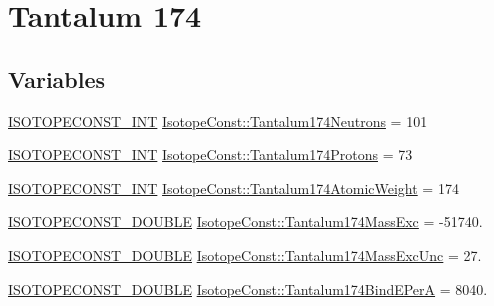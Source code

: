 \hypertarget{group___isotope_const-_tantalum-_ta174}{}\section{Tantalum 174}
\label{group___isotope_const-_tantalum-_ta174}
\subsection*{Variables}
\begin{DoxyCompactItemize}
\item 
\mbox{\hyperlink{group___isotope_const-_macros_ga5f18360b3e99483a35c32d789e62621c}{I\+S\+O\+T\+O\+P\+E\+C\+O\+N\+S\+T\+\_\+\+I\+NT}} \mbox{\hyperlink{group___isotope_const-_tantalum-_ta174_ga6c6c158e1b439ca5400350738d6df4cc}{Isotope\+Const\+::\+Tantalum174\+Neutrons}} = 101
\item 
\mbox{\hyperlink{group___isotope_const-_macros_ga5f18360b3e99483a35c32d789e62621c}{I\+S\+O\+T\+O\+P\+E\+C\+O\+N\+S\+T\+\_\+\+I\+NT}} \mbox{\hyperlink{group___isotope_const-_tantalum-_ta174_ga851a38424bb7b0bd301ebf1d60d036eb}{Isotope\+Const\+::\+Tantalum174\+Protons}} = 73
\item 
\mbox{\hyperlink{group___isotope_const-_macros_ga5f18360b3e99483a35c32d789e62621c}{I\+S\+O\+T\+O\+P\+E\+C\+O\+N\+S\+T\+\_\+\+I\+NT}} \mbox{\hyperlink{group___isotope_const-_tantalum-_ta174_gaeb0d38a351c8b9e22127a6ea1353c285}{Isotope\+Const\+::\+Tantalum174\+Atomic\+Weight}} = 174
\item 
\mbox{\hyperlink{group___isotope_const-_macros_ga8f45a7272ce02c0b4c65c44636ed719a}{I\+S\+O\+T\+O\+P\+E\+C\+O\+N\+S\+T\+\_\+\+D\+O\+U\+B\+LE}} \mbox{\hyperlink{group___isotope_const-_tantalum-_ta174_gaa175f2eac83c3bb587e0e38f9d4d44f2}{Isotope\+Const\+::\+Tantalum174\+Mass\+Exc}} = -\/51740.
\item 
\mbox{\hyperlink{group___isotope_const-_macros_ga8f45a7272ce02c0b4c65c44636ed719a}{I\+S\+O\+T\+O\+P\+E\+C\+O\+N\+S\+T\+\_\+\+D\+O\+U\+B\+LE}} \mbox{\hyperlink{group___isotope_const-_tantalum-_ta174_gabcc28e47443d4ffff348affd42d699d6}{Isotope\+Const\+::\+Tantalum174\+Mass\+Exc\+Unc}} = 27.
\item 
\mbox{\hyperlink{group___isotope_const-_macros_ga8f45a7272ce02c0b4c65c44636ed719a}{I\+S\+O\+T\+O\+P\+E\+C\+O\+N\+S\+T\+\_\+\+D\+O\+U\+B\+LE}} \mbox{\hyperlink{group___isotope_const-_tantalum-_ta174_ga652e6a0aa43050764949f6c5eb846e7b}{Isotope\+Const\+::\+Tantalum174\+Bind\+E\+PerA}} = 8040.
\item 

\end{DoxyCompactItemize}
